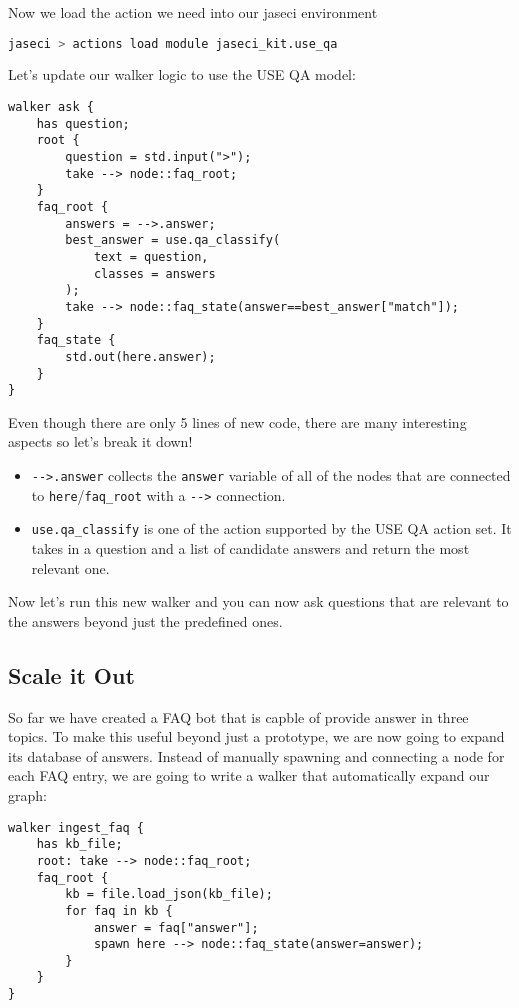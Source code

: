 Now we load the action we need into our jaseci environment

\begin{lstlisting}[language=bash]
jaseci > actions load module jaseci_kit.use_qa
\end{lstlisting}

Let's update our walker logic to use the USE QA model:

\begin{lstlisting}
walker ask {
    has question;
    root {
        question = std.input(">");
        take --> node::faq_root;
    }
    faq_root {
        answers = -->.answer;
        best_answer = use.qa_classify(
            text = question,
            classes = answers
        );
        take --> node::faq_state(answer==best_answer["match"]);
    }
    faq_state {
        std.out(here.answer);
    }
}
\end{lstlisting}

Even though there are only 5 lines of new code, there are many
interesting aspects so let's break it down!

\begin{itemize}
\tightlist
\item
  \lstinline!-->.answer! collects the \lstinline!answer! variable of all
  of the nodes that are connected to
  \lstinline!here!/\lstinline!faq_root! with a \lstinline!-->!
  connection.
\item
  \lstinline!use.qa_classify! is one of the action supported by the USE
  QA action set. It takes in a question and a list of candidate answers
  and return the most relevant one.
\end{itemize}

Now let's run this new walker and you can now ask questions that are
relevant to the answers beyond just the predefined ones.

\subsection{Scale it Out}\label{scale-it-out}

So far we have created a FAQ bot that is capble of provide answer in
three topics. To make this useful beyond just a prototype, we are now
going to expand its database of answers. Instead of manually spawning
and connecting a node for each FAQ entry, we are going to write a walker
that automatically expand our graph:

\begin{lstlisting}
walker ingest_faq {
    has kb_file;
    root: take --> node::faq_root;
    faq_root {
        kb = file.load_json(kb_file);
        for faq in kb {
            answer = faq["answer"];
            spawn here --> node::faq_state(answer=answer);
        }
    }
}
\end{lstlisting}

